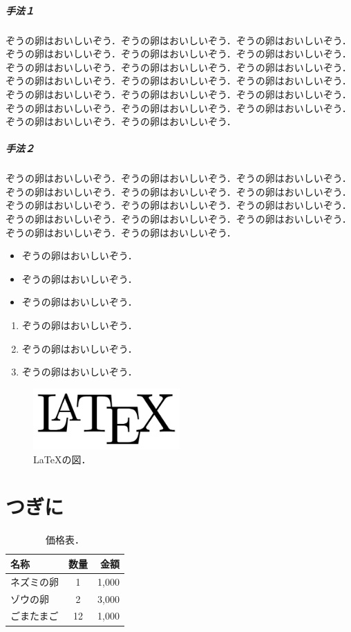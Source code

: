 \documentclass[
	10pt,
	a4j,		%
	twocolumn,	%
	uplatex
]{jsarticle}
\begin{document}
\subparagraph{手法１}
ぞうの卵はおいしいぞう．ぞうの卵はおいしいぞう．ぞうの卵はおいしいぞう．ぞうの卵はおいしいぞう．ぞうの卵はおいしいぞう．ぞうの卵はおいしいぞう．ぞうの卵はおいしいぞう．ぞうの卵はおいしいぞう．ぞうの卵はおいしいぞう．ぞうの卵はおいしいぞう．ぞうの卵はおいしいぞう．ぞうの卵はおいしいぞう．ぞうの卵はおいしいぞう．ぞうの卵はおいしいぞう．ぞうの卵はおいしいぞう．ぞうの卵はおいしいぞう．ぞうの卵はおいしいぞう．ぞうの卵はおいしいぞう．ぞうの卵はおいしいぞう．ぞうの卵はおいしいぞう．

\subparagraph{手法２}
ぞうの卵はおいしいぞう．ぞうの卵はおいしいぞう．ぞうの卵はおいしいぞう．ぞうの卵はおいしいぞう．ぞうの卵はおいしいぞう．ぞうの卵はおいしいぞう．ぞうの卵はおいしいぞう．ぞうの卵はおいしいぞう．ぞうの卵はおいしいぞう．ぞうの卵はおいしいぞう．ぞうの卵はおいしいぞう．ぞうの卵はおいしいぞう．ぞうの卵はおいしいぞう．ぞうの卵はおいしいぞう．

\begin{itemize}
	\item ぞうの卵はおいしいぞう．
	\item ぞうの卵はおいしいぞう．
	\item ぞうの卵はおいしいぞう．
\end{itemize}
\begin{enumerate}
	\item ぞうの卵はおいしいぞう．
	\item ぞうの卵はおいしいぞう．
	\item ぞうの卵はおいしいぞう．
\end{enumerate}

\begin{figure}[t]
	\centering
	\includegraphics[clip,width=0.5\textwidth]{fig/LaTeX.pdf}
	\caption{
		\LaTeX{}の図．
		\label{fig:latex}
	}
\end{figure}

\section{つぎに}
\begin{table}[t]
	\centering
	\caption{
		価格表．
		\label{tab:egg}
	}
	\begin{tabular}{l|cr}
		\toprule
		名称    &   数量  &   金額 \\
		\midrule
		ネズミの卵   &   1    &   1,000 \\
		ゾウの卵   &   2    &   3,000 \\
		ごまたまご &	12 & 1,000 \\
		\bottomrule
	\end{tabular}
\end{table}
\end{document}
